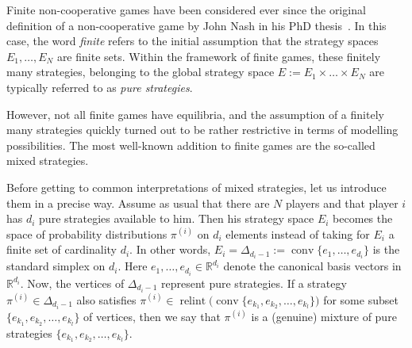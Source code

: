 \documentclass[a4paper,11pt,reqno,english]{amsart}
\theoremstyle{plain}
\theoremstyle{definition}
\begin{document}
Finite non-cooperative games have been considered ever since the original definition of a non-cooperative game by John Nash in his PhD thesis~\cite{NashPhD}. In this case, the word \textit{finite} refers to the initial assumption that the strategy spaces $E_1,\dots, E_N$ are finite sets.
Within the framework of finite games, these finitely many strategies, belonging to the global strategy space $E:=E_1\times\dots\times E_N$ are typically referred to as \textit{pure strategies}.

\medskip
However, not all finite games have equilibria, and the assumption of a finitely many strategies quickly turned out to be rather restrictive in terms of modelling possibilities.
The most well-known addition to finite games are the so-called mixed strategies.

\medskip
Before getting to common interpretations of mixed strategies, let us introduce them in a precise way.
Assume as usual that there are $N$ players and that player $i$ has $d_i$ pure strategies available to him.
Then his strategy space $E_i$ becomes the space of probability distributions $\pi^{(i)}$ on $d_i$ elements instead of taking for $E_i$ a finite set of cardinality $d_i$.
In other words, $E_i=\Delta_{d_i-1}:=\operatorname{conv}\{e_1,\dots,e_{d_i}\}$ is the standard simplex on $d_i$.
Here $e_1,\dots,e_{d_i}\in\mathbb{R}^{d_i}$ denote the canonical basis vectors in $\mathbb{R}^{d_i}$.
Now, the vertices of $\Delta_{d_i-1}$ represent pure strategies.
If a strategy $\pi^{(i)}\in\Delta_{d_i-1}$ also satisfies $\pi^{(i)}\in\operatorname{relint}\big(\operatorname{conv}\{e_{k_1},e_{k_2},\dots,e_{k_l}\}\big)$ for some subset $\{e_{k_1},e_{k_2},\dots,e_{k_l}\}$ of vertices, then we say that $\pi^{(i)}$ is a (genuine) mixture of pure strategies $\{e_{k_1},e_{k_2},\dots,e_{k_l}\}$.
\end{document}

